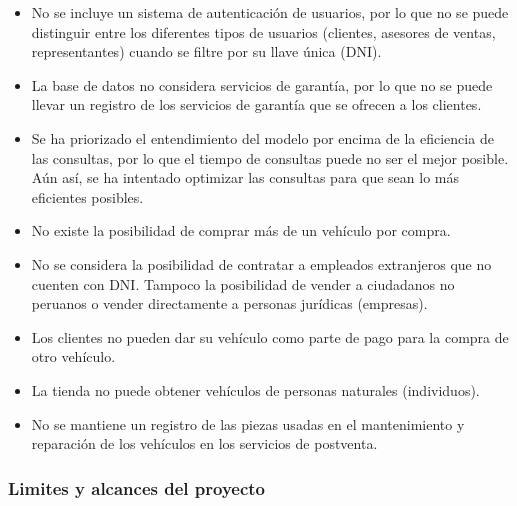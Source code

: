 \documentclass[12pt]{article}
\begin{document}
\begin{itemize}

\item No se incluye un sistema de autenticación de usuarios, por lo que no se puede distinguir entre los diferentes tipos de usuarios (clientes, asesores de ventas, representantes) cuando se filtre por su llave única (DNI).

\item La base de datos no considera servicios de garantía, por lo que no se puede llevar un registro de los servicios de garantía que se ofrecen a los clientes.

\item Se ha priorizado el entendimiento del modelo por encima de la eficiencia de las consultas, por lo que el tiempo de consultas puede no ser el mejor posible. Aún así, se ha intentado optimizar las consultas para que sean lo más eficientes posibles.

\item No existe la posibilidad de comprar más de un vehículo por compra.

\item No se considera la posibilidad de contratar a empleados extranjeros que no cuenten con DNI. Tampoco la posibilidad de vender a ciudadanos no peruanos o vender directamente a personas jurídicas (empresas).

\item Los clientes no pueden dar su vehículo como parte de pago para la compra de otro vehículo.

\item La tienda no puede obtener vehículos de personas naturales (individuos).

\item No se mantiene un registro de las piezas usadas en el mantenimiento y reparación de los vehículos en los servicios de postventa.

\end{itemize}


\subsubsection{Limites y alcances del proyecto}
\end{document}
